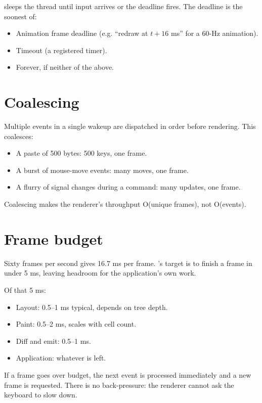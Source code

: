  sleeps the thread until input
arrives or the deadline fires. The deadline is the soonest of:

\begin{itemize}[leftmargin=*]
  \item Animation frame deadline (e.g. ``redraw at $t + 16$ ms''
    for a 60-Hz animation).
  \item Timeout (a registered timer).
  \item Forever, if neither of the above.
\end{itemize}

\section{Coalescing}

Multiple events in a single wakeup are dispatched in order
before rendering. This coalesces:

\begin{itemize}[leftmargin=*]
  \item A paste of 500 bytes: 500 keys, one frame.
  \item A burst of mouse-move events: many moves, one frame.
  \item A flurry of signal changes during a command: many
    updates, one frame.
\end{itemize}

Coalescing makes the renderer's throughput O(unique frames), not
O(events).

\section{Frame budget}

Sixty frames per second gives 16.7 ms per frame. \maya{}'s
target is to finish a frame in under 5 ms, leaving headroom for
the application's own work.

Of that 5 ms:

\begin{itemize}[leftmargin=*]
  \item Layout: 0.5--1 ms typical, depends on tree depth.
  \item Paint: 0.5--2 ms, scales with cell count.
  \item Diff and emit: 0.5--1 ms.
  \item Application: whatever is left.
\end{itemize}

If a frame goes over budget, the next event is processed
immediately and a new frame is requested. There is no
back-pressure: the renderer cannot ask the keyboard to slow down.

